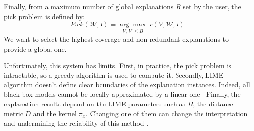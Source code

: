 Finally, from a maximum number of global explanations $B$ set by the user, the 
pick problem is defined by:
    \begin{equation} \label{eq:}
        Pick( \mathcal{W},I) = \underset{V, |V| \leqslant B}{\arg \max} \; c(V, \mathcal{W}, I) 
    \end{equation}
We want to select the highest coverage and non-redundant explanations to provide a global 
one. 


Unfortunately, this system has limits. First, in practice, the pick problem is intractable, 
so a greedy algorithm is used to compute it. 
Secondly, LIME algorithm doesn't define clear boundaries of the explanation instances. Indeed, 
all black-box models cannot be locally approximated by a linear one \cite{ribeiro_nothing_2016}. 
Finally, the explanation results depend on the LIME parameters such as $B$, the distance metric 
$D$ and the kernel $ \pi_x$. Changing one of them can change the interpretation and 
undermining the reliability of this method \cite{wilking_fooling_2022}.